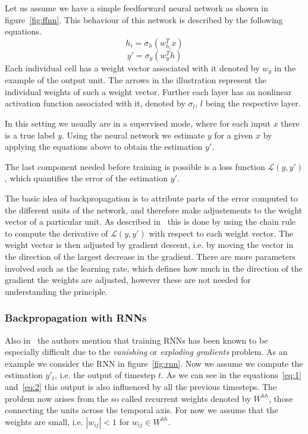 Let us assume we have a simple feedforward neural network as shown in figure~\ref{fig:ffnn}.
This behaviour of this network is described by the following equations.
\begin{equation}\label{eq:3}
    h_i = \sigma_h(w_{h_i}^Tx)
\end{equation}
\begin{equation}\label{eq:4}
    y' = \sigma_y(w_{y}^Th)
\end{equation}
Each individual cell has a weight vector associated with it denoted by $w_y$ in the example of the output unit.
The arrows in the illustration represent the individual weights of such a weight vector.
Further each layer has an nonlinear activation function associated with it, denoted by $\sigma_l$, $l$ being the respective layer.
\par
In this setting we usually are in a supervised mode, where for each input $x$ there is a true label $y$.
Using the neural network we estimate $y$ for a given $x$ by applying the equations above to obtain the estimation $y'$.
\par
The last component needed before training is possible is a loss function $\mathcal{L}(y, y')$, which quantifies the error of the estimation $y'$.
\par
The basic idea of backpropagation is to attribute parts of the error computed to the different units of the network, and therefore make adjustements to the weight vector of a particular unit.
As described in~\cite{rnn_survey} this is done by using the chain rule to compute the derivative of $\mathcal{L}(y, y')$ with respect to each weight vector.
The weight vector is then adjusted by gradient descent, i.e. by moving the vector in the direction of the largest decrease in the gradient.
There are more parameters involved such as the learning rate, which defines how much in the direction of the gradient the weights are adjusted, however these are not needed for understanding the principle.
\subsubsection{Backpropagation with RNNs}
Also in~\cite{rnn_survey} the authors mention that training RNNs has been known to be especially difficult due to the \emph{vanishing} or \emph{exploding gradients} problem.
As an example we consider the RNN in figure~\ref{fig:rnn}.
Now we assume we compute the estimation $y'_t$, i.e. the output of timestep $t$.
As we can see in the equations~\ref{eq:1} and~\ref{eq:2} this output is also influenced by all the previous timesteps.
The problem now arises from the so called recurrent weights denoted by $W^{hh}$, those connecting the units across the temporal axis.
For now we assume that the weights are small, i.e. $|w_{ij}| < 1$ for $w_{ij} \in W^{hh}$.
